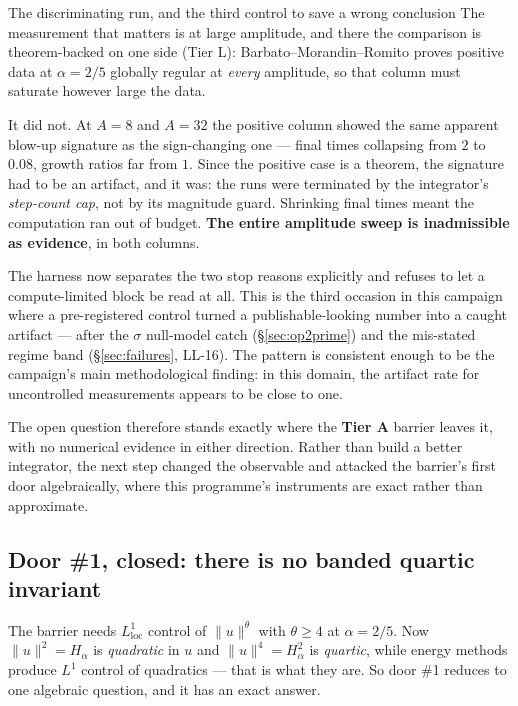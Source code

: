 \documentclass[11pt,a4paper]{article}
\newcommand{\tA}{\textcolor{TierA}{\textbf{Tier A}}}
\newcommand{\tL}{\textsf{Tier L}}
\theoremstyle{definition}
\theoremstyle{plain}
\begin{document}
\begin{keybox}{The discriminating run, and the third control to save a wrong conclusion}
The measurement that matters is at large amplitude, and there the comparison is theorem-backed
on one side (\tL{}): Barbato--Morandin--Romito \cite{barbato-morandin-romito} proves positive
data at $\alpha=2/5$ globally regular at
\emph{every} amplitude, so that column must saturate however large the data.

It did not. At $A=8$ and $A=32$ the positive column showed the same apparent blow-up signature
as the sign-changing one --- final times collapsing from $2$ to $0.08$, growth ratios far from
$1$. Since the positive case is a theorem, the signature had to be an artifact, and it was: the
runs were terminated by the integrator's \emph{step-count cap}, not by its magnitude guard.
Shrinking final times meant the computation ran out of budget. \textbf{The entire amplitude
sweep is inadmissible as evidence}, in both columns.

The harness now separates the two stop reasons explicitly and refuses to let a compute-limited
block be read at all. This is the third occasion in this campaign where a pre-registered
control turned a publishable-looking number into a caught artifact --- after the $\sigma$
null-model catch (\S\ref{sec:op2prime}) and the mis-stated regime band (\S\ref{sec:failures},
LL-16). The pattern is consistent enough to be the campaign's main methodological finding: in
this domain, the artifact rate for uncontrolled measurements appears to be close to one.
\end{keybox}

The open question therefore stands exactly where the \tA{} barrier leaves it, with no numerical
evidence in either direction. Rather than build a better integrator, the next step changed the
observable and attacked the barrier's first door algebraically, where this programme's
instruments are exact rather than approximate.

\subsection{Door \#1, closed: there is no banded quartic invariant}

The barrier needs $L^1_{\mathrm{loc}}$ control of $\|u\|^\theta$ with $\theta\ge4$ at
$\alpha=2/5$. Now $\|u\|^2=H_\alpha$ is \emph{quadratic} in $u$ and $\|u\|^4=H_\alpha^2$ is
\emph{quartic}, while energy methods produce $L^1$ control of quadratics --- that is what they
are. So door \#1 reduces to one algebraic question, and it has an exact answer.
\end{document}
